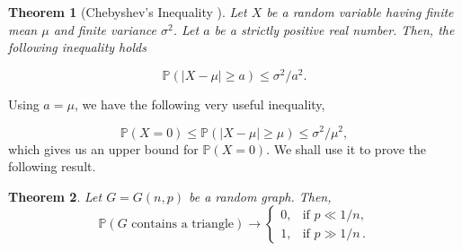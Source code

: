 \documentclass[12pt,twoside,a4paper,bibliography=totocnumbered]{book}
\numberwithin{equation}{section}
\newtheorem{theorem}             {Theorem}[section]
\theoremstyle{remark}
\begin{document}
\begin{theorem}[{Chebyshev's Inequality \cite{Ch67}}] Let  $X$ be a random variable having finite mean $\mu$ and finite variance  $\sigma^2$. Let $a$ be a strictly positive real number. Then, the following inequality holds

$$\mathbb{P}(|X-\mu| \geq a) \leq \sigma^2/a^2.$$
\end{theorem} 

Using $a = \mu$, we have the following very useful inequality,

$$\mathbb{P}(X=0) \leq \mathbb{P}(|X-\mu | \geq \mu) \leq \sigma^2/\mu^2,$$
which gives us an upper bound for $\mathbb{P}(X=0)$. We shall use it to prove the following result.\\

\begin{theorem}
Let $G=G(n,p)$ be a random graph.
Then,
$$
\mathbb{P}(G\text{ contains a triangle}) \rightarrow 
\begin{cases}
		0, &\text{if $p\ll 1/n$},\\
		1, &\text{if $p\gg 1/n$}\,.
\end{cases}
$$
\end{theorem}
\end{document}
